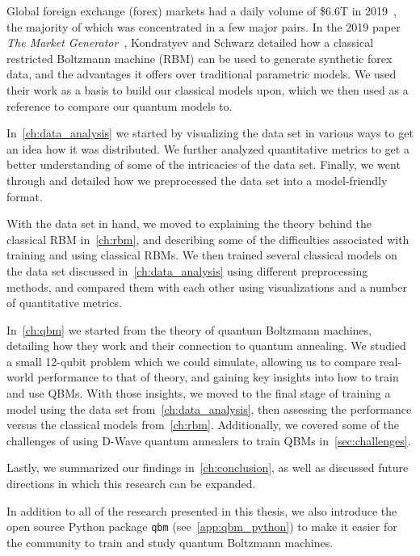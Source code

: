 Global foreign exchange (forex) markets had a daily volume of \$6.6T in 2019~\cite{bis_2019}, the majority of which was concentrated in a few major pairs.
In the 2019 paper \textit{The Market Generator}~\cite{kondratyev_2019}, Kondratyev and Schwarz detailed how a classical restricted Boltzmann machine (RBM) can be used to generate synthetic forex data, and the advantages it offers over traditional parametric models.
We used their work as a basis to build our classical models upon, which we then used as a reference to compare our quantum models to.

In~\cref{ch:data_analysis} we started by visualizing the data set in various ways to get an idea how it was distributed.
We further analyzed quantitative metrics to get a better understanding of some of the intricacies of the data set.
Finally, we went through and detailed how we preprocessed the data set into a model-friendly format.

With the data set in hand, we moved to explaining the theory behind the classical RBM in~\cref{ch:rbm}, and describing some of the difficulties associated with training and using classical RBMs.
We then trained several classical models on the data set discussed in~\cref{ch:data_analysis} using different preprocessing methods, and compared them with each other using visualizations and a number of quantitative metrics.

In~\cref{ch:qbm} we started from the theory of quantum Boltzmann machines, detailing how they work and their connection to quantum annealing.
We studied a small 12-qubit problem which we could simulate, allowing us to compare real-world performance to that of theory, and gaining key insights into how to train and use QBMs.
With those insights, we moved to the final stage of training a model using the data set from~\cref{ch:data_analysis}, then assessing the performance versus the classical models from~\cref{ch:rbm}.
Additionally, we covered some of the challenges of using D-Wave quantum annealers to train QBMs in~\cref{sec:challenges}.

Lastly, we summarized our findings in~\cref{ch:conclusion}, as well as discussed future directions in which this research can be expanded.

In addition to all of the research presented in this thesis, we also introduce the open source Python package \texttt{qbm} (see~\cref{app:qbm_python}) to make it easier for the community to train and study quantum Boltzmann machines.
